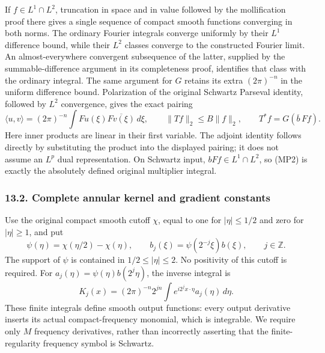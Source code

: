 \documentclass[
  11pt,
]{article}
\makeatletter
\let\ReaderOriginalAnchorStart\hyper@anchorstart
\let\ReaderOriginalAnchorEnd\hyper@anchorend
\let\ReaderPendingAliases\@empty
\def\ReaderArmAliases#1{\gdef\ReaderPendingAliases{#1}}
\def\hyper@anchorstart#1{\ReaderIfNativeAnchorTF{#1}{\ReaderPendingAliases\global\let\ReaderPendingAliases\@empty}{}\ReaderOriginalAnchorStart{#1}}
\makeatother
\begin{document}
If \(f\in L^1\cap L^2\), truncation in space and in value followed by
the mollification proof there gives a single sequence of compact smooth
functions converging in both norms. The ordinary Fourier integrals
converge uniformly by their \(L^1\) difference bound, while their
\(L^2\) classes converge to the constructed Fourier limit. An
almost-everywhere convergent subsequence of the latter, supplied by the
summable-difference argument in its completeness proof, identifies that
class with the ordinary integral. The same argument for \(G\) retains
its extra \((2\pi)^{-n}\) in the uniform difference bound. Polarization
of the original Schwartz Parseval identity, followed by \(L^2\)
convergence, gives the exact pairing \[
 \langle u,v\rangle
   =(2\pi)^{-n}\int Fu(\xi)\overline{Fv(\xi)}\,d\xi,\qquad
 \|Tf\|_2\leq B\|f\|_2,\qquad
 T^*f=G(\overline b\,Ff).
                                                               \tag{MP3}
\] Here inner products are linear in their first variable. The adjoint
identity follows directly by substituting the product into the displayed
pairing; it does not assume an \(L^p\) dual representation. On Schwartz
input, \(bFf\in L^1\cap L^2\), so (MP2) is exactly the absolutely
defined original multiplier integral.

\ReaderArmAliases{\ReaderOriginalAnchorStart{AN03-LCE-MULT-002}\ReaderOriginalAnchorEnd\begingroup\expandafter\def\csname @currentHref\endcsname{AN03-LCE-MULT-002}\label{AN03-LCE-MULT-002}\endgroup\ReaderOriginalAnchorStart{complete-annular-kernel-and-gradient-constants}\ReaderOriginalAnchorEnd}
\subsubsection{13.2. Complete annular kernel and gradient
constants}\label{complete-annular-kernel-and-gradient-constants}

Use the original compact smooth cutoff \(\chi\), equal to one for
\(|\eta|\leq1/2\) and zero for \(|\eta|\geq1\), and put \[
 \psi(\eta)=\chi(\eta/2)-\chi(\eta),\qquad
 b_j(\xi)=\psi(2^{-j}\xi)b(\xi),\qquad j\in\mathbb Z .
                                                               \tag{MP4}
\] The support of \(\psi\) is contained in \(1/2\leq|\eta|\leq2\). No
positivity of this cutoff is required. For
\(a_j(\eta)=\psi(\eta)b(2^j\eta)\), the inverse integral is \[
 K_j(x)=(2\pi)^{-n}2^{jn}
                 \int e^{i2^jx\cdot\eta}a_j(\eta)\,d\eta .
                                                               \tag{MP5}
\] These finite integrals define smooth output functions: every output
derivative inserts its actual compact-frequency monomial, which is
integrable. We require only \(M\) frequency derivatives, rather than
incorrectly asserting that the finite-regularity frequency symbol is
Schwartz.
\end{document}
